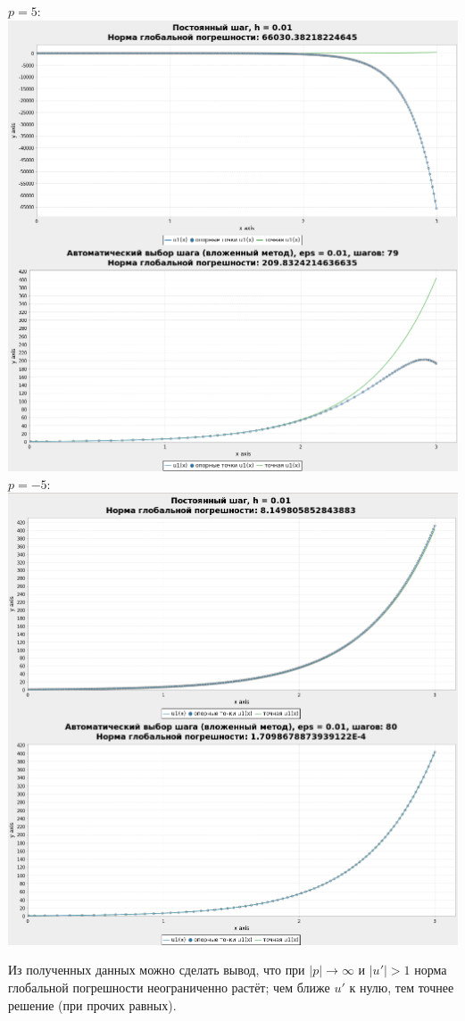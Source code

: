 \documentclass[a4paper,12pt]{article}
\begin{document}
\begin{flushleft}
\begin{enumerate}
      $p = 5:$\linebreak\linebreak\includegraphics{xp5.png}\linebreak\linebreak
      $p = -5:$\linebreak\linebreak\includegraphics{xpm5.png}\linebreak\linebreak

      Из полученных данных можно сделать вывод, что при $\mathopen|p\mathclose| \rightarrow \infty$ и \(\mathopen|u'\mathclose| > 1\) норма глобальной погрешности неограниченно растёт; чем ближе $u'$ к нулю, тем точнее решение (при прочих равных).

  \end{enumerate}
\end{flushleft}
\end{document}
